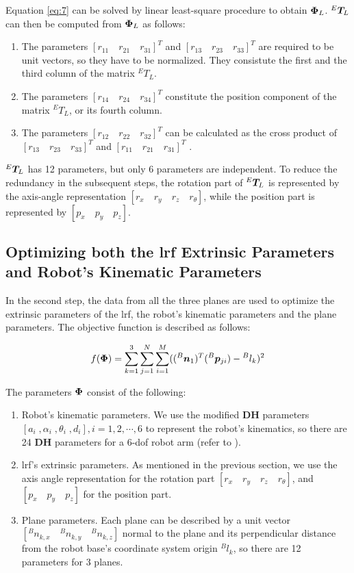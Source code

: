 Equation \eqref{eq:7} can be solved by linear least-square procedure to obtain $\vb*{\Phi}_L$. ${^E}\vb*{T}_L$ can then be computed from $\vb*{\Phi}_L$ as follows:
\begin{enumerate}
\item The parameters $[r_{11} \quad r_{21} \quad r_{31}]^T$ and $[r_{13} \quad r_{23} \quad r_{33}]^T$ are required to be unit vectors, so they have to be normalized. They consistute the first and the third column of the matrix ${^E}T_L$.
\item The parameters $[r_{14} \quad r_{24} \quad r_{34}]^T$ constitute the position component of the matrix ${^E}T_L$, or its fourth column.
\item The parameters $[r_{12} \quad r_{22} \quad r_{32}]^T$ can be calculated as the cross product of  $[r_{13} \quad r_{23} \quad r_{33}]^T$ and $[r_{11} \quad r_{21} \quad r_{31}]^T$ .
\end{enumerate}

${^E}\vb*{T}_L$ has 12 parameters, but only 6 parameters are independent. To reduce the redundancy in the subsequent steps, the rotation part of ${^E}\vb*{T}_L$ is represented by the axis-angle representation $[r_x \quad r_y \quad r_z \quad r_{\theta}]$, while the position part is represented by  $[p_x \quad p_y\quad p_z]$.


\subsection{Optimizing both the \ac{lrf} Extrinsic Parameters and Robot's Kinematic Parameters}
\label{sec:second_step}
In the second step, the data from all the three planes are used to optimize the extrinsic parameters of the \ac{lrf}, the robot's kinematic parameters and the plane parameters. The objective function is described as follows:

\begin{equation}
 f (\vb*{\Phi}) =  \sum_{k=1}^{3} \sum_{j=1}^{N} \sum_{i=1}^{M} (({^B}\vb*{n}_1) ^T ({^B}\vb*{p}_{ji}) - {^B}l_k)^2
\end{equation}

The parameters $\vb*{\Phi}$ consist of the following:
\begin{enumerate}
\item Robot's kinematic parameters. We use the modified \textbf{DH} parameters \cite{Hayati1985} $[a_i \;, \alpha_i \;,\theta_i \;,d_i], i=1, 2, \cdots ,6$ to represent the robot's kinematics, so there are 24 \textbf{DH} parameters for a 6-\ac{dof} robot arm (refer to ). 
\item \ac{lrf}'s extrinsic parameters. As mentioned in the previous section, we use the axis angle representation for the rotation part $[r_x \quad r_y \quad r_z \quad r_{\theta}]$, and $[p_x \quad p_y\quad p_z]$ for the position part. 
\item Plane parameters. Each plane can be described by a unit vector $[{^B}n_{k,x}\quad {^B}n_{k,y}\quad {^B}n_{k,z}]$ normal to the plane and its perpendicular distance from the robot base's coordinate system origin ${^B}l_{k}$, so there are 12 parameters for 3 planes.
\end{enumerate}

